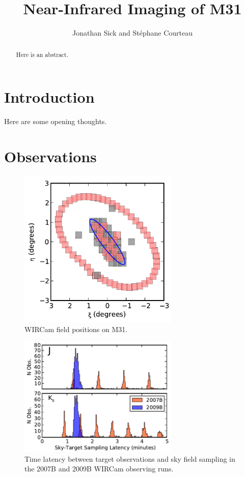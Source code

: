 \documentclass[iop]{emulateapj}
\begin{document}
\title{Near-Infrared Imaging of M31}
\author{Jonathan Sick and Stéphane Courteau}

\begin{abstract}
Here is an abstract.
\end{abstract}

\section{Introduction}
\label{sec:intro}

Here are some opening thoughts.

\section{Observations}
\label{sec:Observations}

\begin{figure}[t]
	\centering
		\includegraphics[width=3in]{figs/fieldmap}
	\caption{WIRCam field positions on M31.}
	\label{fig:fieldmap}
\end{figure}

\begin{figure}[t]
    \centering
        \includegraphics[width=3in]{figs/sky_target_lag}
    \caption{Time latency between target observations and sky field sampling in the 2007B and 2009B WIRCam observing runs.}
    \label{fig:sky_target_lag}
\end{figure}
\end{document}
